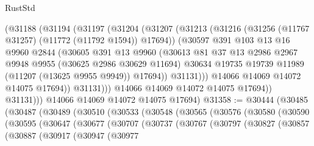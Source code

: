 \begin{lexlean}{RustStd}
\begin{coremodule}
                  (@31188
                    (@31194
                      (@31197
                        (@31204
                          (@31207
                            (@31213
                              (@31216 (@31256 (@11767 @31257) (@11772 (@11792 @1594)) @17694))
                              (@30597
                                @391
                                @103
                                @13
                                @16
                                @9960
                                @2844
                                (@30605
                                  @391
                                  @13
                                  @9960
                                  (@30613
                                    @81
                                    @37
                                    @13
                                    @2986
                                    @2967
                                    @9948
                                    @9955
                                    (@30625 @2986 @30629 @11694)
                                    @30634
                                    @19735
                                    @19739
                                    @11989
                                    (@11207 (@13625 @9955 @9949))
                                    @17694))
                                @31131)))
                          @14066
                          @14069
                          @14072
                          @14075
                          @17694))
                      @31131)))
                @14066
                @14069
                @14072
                @14075
                @17694))
            @31131)))
      @14066
      @14069
      @14072
      @14075
      @17694)
@31358 := @30444
    (@30485
      (@30487
        (@30489
          (@30510
            (@30533
              (@30548
                (@30565
                  (@30576
                    (@30580
                      (@30590
                        (@30595
                          (@30647
                            (@30677
                              (@30707
                                (@30737
                                  (@30767
                                    (@30797
                                      (@30827
                                        (@30857
                                          (@30887
                                            (@30917
                                              (@30947
                                                (@30977

\end{coremodule}
\end{lexlean}
